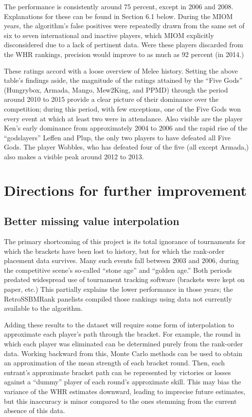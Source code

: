 \documentclass[10pt]{article}
\theoremstyle{definition}
\theoremstyle{remark}
\begin{document}
The performance is consistently around 75 percent, except in 2006 and 2008. Explanations for these can be found in Section 6.1 below. During the MIOM years, the algorithm's false positives were repeatedly drawn from the same set of six to seven international and inactive players, which MIOM explicitly disconsidered due to a lack of pertinent data. Were these players discarded from the WHR rankings, precision would improve to as much as 92 percent (in 2014.)

These ratings accord with a loose overview of Melee history. Setting the above table's findings aside, the magnitude of
the ratings attained by the ``Five Gods'' (Hungrybox, Armada, Mango, Mew2King, and PPMD) through the period around 2010 to 2015 provide a clear picture of their dominance over the competition; during this period, with few exceptions, one of the Five Gods won every event at which at least two were in attendance. Also visible are the player Ken's early dominance from approximately 2004 to 2006 and the rapid rise of the ``godslayers'' Leffen and Plup, the only two players to have defeated all Five Gods. The player Wobbles, who has defeated four of the five (all except Armada,) also makes a visible peak around 2012 to 2013.

\section{Directions for further improvement}

\subsection{Better missing value interpolation}
The primary shortcoming of this project is its total ignorance of tournaments
for which the brackets have been lost to history, but for which the
rank-order placement data survives. Many such events fall between 2003 and
2006, during the competitive scene's so-called ``stone age'' and ``golden
age.'' Both periods predated widespread use of tournament tracking software
(brackets were kept on paper, etc.) This partially explains the lower
performance in those years; the RetroSSBMRank panelists compiled those
rankings using data not currently available to the algorithm.

\par Adding these results to the dataset will require some form of
interpolation to approximate each player's path through the bracket. For
example, the round in which each player was eliminated can be determined
purely from the rank-order data. Working backward from this, Monte
Carlo methods can be used to obtain an approximation of the mean strength of
each bracket round. Then, each entrant's approximate bracket path can be
represented by victories or losses against a ``dummy'' player of each round's
approximate skill. This may bias the variance of the WHR estimates downward,
leading to imprecise future estimates, but this inaccuracy is minor compared
to the ones stemming from the current absence of this data.
\end{document}
